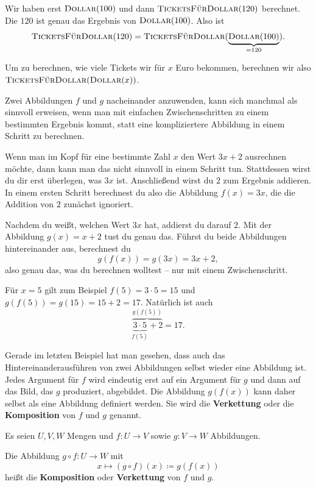 \documentclass[../../main.tex]{subfiles}
\begin{document}
\begin{example}{}
    Wir haben erst $\textsc{Dollar}(100)$ und dann $\textsc{TicketsFürDollar}(120)$ berechnet. Die $120$ ist genau das Ergebnis von $\textsc{Dollar}(100)$. Also ist \[\textsc{TicketsFürDollar}(120)=\textsc{TicketsFürDollar}(\underbrace{\textsc{Dollar}(100)}_{=120}).\]
    
    Um zu berechnen, wie viele Tickets wir für $x$ Euro bekommen, berechnen wir also $\textsc{TicketsFürDollar}(\textsc{Dollar}(x))$.
\end{example}

Zwei Abbildungen $f$ und $g$ nacheinander anzuwenden, kann sich manchmal als sinnvoll erweisen, wenn man mit einfachen Zwischenschritten zu einem bestimmten Ergebnis kommt, statt eine kompliziertere Abbildung in einem Schritt zu berechnen.

\begin{example}{}
    Wenn man im Kopf für eine bestimmte Zahl $x$ den Wert $3x+2$ ausrechnen möchte, dann kann man das nicht sinnvoll in einem Schritt tun. Stattdessen wirst du dir erst überlegen, was $3x$ ist. Anschließend wirst du $2$ zum Ergebnis addieren. In einem ersten Schritt berechnest du also die Abbildung $f(x)=3x$, die die Addition von $2$ zunächst ignoriert.
    
    Nachdem du weißt, welchen Wert $3x$ hat, addierst du darauf $2$. Mit der Abbildung $g(x)=x+2$ tust du genau das. Führst du beide Abbildungen hintereinander aus, berechnest du \[g(f(x))=g(3x)=3x+2,\] also genau das, was du berechnen wolltest -- nur mit einem Zwischenschritt.
    
    Für $x=5$ gilt zum Beispiel $f(5)=3\cdot 5=15$ und $g(f(5))=g(15)=15+2=17$. Natürlich ist auch \[\overbrace{\underbrace{3\cdot 5}_{f(5)}+2}^{g(f(5))}=17.\]
\end{example}

Gerade im letzten Beispiel hat man gesehen, dass auch das Hintereinanderausführen von zwei Abbildungen selbst wieder eine Abbildung ist. Jedes Argument für $f$ wird eindeutig erst auf ein Argument für $g$ und dann auf das Bild, das $g$ produziert, abgebildet. Die Abbildung $g(f(x))$ kann daher selbst als eine Abbildung definiert werden. Sie wird die \textbf{Verkettung} oder die \textbf{Komposition} von $f$ und $g$ genannt.

\begin{definition}
    Es seien $U,V,W$ Mengen und $f\colon U\rightarrow V$ sowie $g\colon V\rightarrow W$ Abbildungen.
    
    Die Abbildung $g\circ f\colon U\rightarrow W$ mit \[x\mapsto (g\circ f)(x)\coloneqq g(f(x))\] heißt die \textbf{Komposition} oder \textbf{Verkettung} von $f$ und $g$.
\end{definition}
\end{document}
